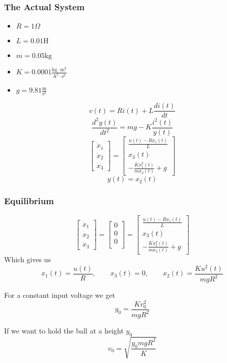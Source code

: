 \documentclass{beamer}
\begin{document}
\begin{frame}
\frametitle{The Actual System}
\begin{itemize}
\item $R = 1 \Omega $
\item $L = 0.01 \text{H}$
\item $m = 0.05 \text{kg}$
\item $K = 0.0001 \frac{\text{kg}\cdot\text{m}^2}{\text{A}^2\cdot\text{s}^2}$
\item $g = 9.81 \frac{\text{m}}{\text{s}^2}$
\end{itemize}
$$ v(t) = Ri(t) + L \frac{di(t)}{dt} $$
$$ \frac{d^2y(t)}{dt^2} = mg - K \frac{i^2(t)}{y(t)} $$
$$
\begin{bmatrix}
\dot{x}_1 \\
\dot{x}_2 \\
\dot{x}_3
\end{bmatrix}
=
\begin{bmatrix}
\frac{u(t)-Rx_1(t)}{L} \\
x_3(t) \\
-\frac{Kx_1^2(t)}{mx_2(t)} + g
\end{bmatrix}
$$
$$
y(t) = x_2(t)
$$
\end{frame}

\begin{frame}
\frametitle{Equilibrium}
$$
\begin{bmatrix}
\dot{x}_1 \\
\dot{x}_2 \\
\dot{x}_3
\end{bmatrix}
=
\begin{bmatrix}
0 \\
0 \\
0 \\
\end{bmatrix}
=
\begin{bmatrix}
\frac{u(t)-Rx_1(t)}{L} \\
x_3(t) \\
-\frac{Kx_1^2(t)}{mx_2(t)} + g
\end{bmatrix}
$$
Which gives us
$$ x_1(t) = \frac{u(t)}{R}, \qquad x_3(t) = 0, \qquad x_2(t) = \frac{Ku^2(t)}{mgR^2} $$
\begin{minipage}{.45\textwidth}
    For a constant input voltage we get
    $$ y_0 = \frac{Kv_0^2}{mgR^2} $$
\end{minipage}
\hfill
\begin{minipage}{.45\textwidth}
    If we want to hold the ball at a height $y_0$
    $$ v_0 = \sqrt{\frac{y_0mgR^2}{K}} $$
\end{minipage}%
\end{frame}
\end{document}
